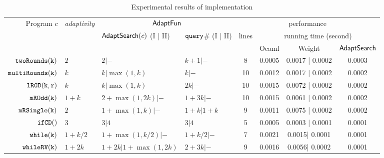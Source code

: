 {\footnotesize
\begin {table}[H]
\vspace{-0.4cm}
    \caption{Experimental results of {\THESYSTEM} implementation}
    \vspace{-0.5cm}
        \label{tb:adapt-imp}
        \begin{center}
        \centering
{\tiny
        \begin{tabular}{ r | l | l | l | c | c | c | c  }
        \multirow{3}{*}{Program $c$} & 
        \multirow{3}{*}{\emph{adaptivity}}
         & \multicolumn{2}{c|}{$\textsf{AdaptFun}$}
         & \multicolumn{4}{c}{performance} \\ 
         \cline{3-8}
         & & \multirow{2}{*}{$\mathsf{AdaptSearch}(c)$ (I | II) } & \multirow{2}{*}{${\tt query}$\# (I | II) } & \multirow{2}{*}{lines} & \multicolumn{3}{c}{running time (second)} \\ 
         \cline{6-8}
         & & & &  & Ocaml & Weight & $\mathsf{AdaptSearch}$  \\
         \hline \hline
         $  \mathtt{twoRounds(k)}$ & $2$ &  $2| -$ & $k+1 | -$  & 8 & 0.0005 & 0.0017 | 0.0002 & 0.0003 \\
         $  \mathtt{multiRounds(k)}$ & $k$ &  $k| \max(1,k)$ & $k| -$  &  10 & 0.0012 & 0.0017 | 0.0002 & 0.0002 \\
         $  \mathtt{lRGD(k, r)}$ & $k$ & $k | \max(1,k) $ & $ 2k | -$  &  10 & 0.0015 & 0.0072 | 0.0002 & 0.0002  \\
         $  \mathtt{mROdd(k)}$ & $1 + k$ &  $2+\max(1,2k) | - $ & $1 + 3 k | - $  &  10 & 0.0015 & 0.0061 | 0.0002 & 0.0002 \\
         $  \mathtt{mRSingle(k)}$    & $2$ &  $1+ \max(1, k) | -$ & $1 + k | 1 + k$  &  9 & 0.0011 & 0.0075 | 0.0002 & 0.0002 \\
         $  \mathtt{ifCD()}$ & $3$ & $3 | 4$ &   $3| 4$  & 5 & 0.0005 & 0.0003 | 0.0001  & 0.0001 \\
         $  \mathtt{while(k)}$ & $1+k/2$ &   $1 +\max(1, k/2) |- $  &  $1+k/2 | - $ & 7 & 0.0021 & 0.0015| 0.0001 &  0.0001 \\
         $  \mathtt{whileRV(k)}$ & $1 + 2k$ &  $1 + 2k| 1 + \max(1,2k)$ & $2 + 3 k| -$  &  9 & 0.0016 & 0.0056| 0.0002 & 0.0001  \\

\end{tabular}}
\end{center}
\end{table}}
